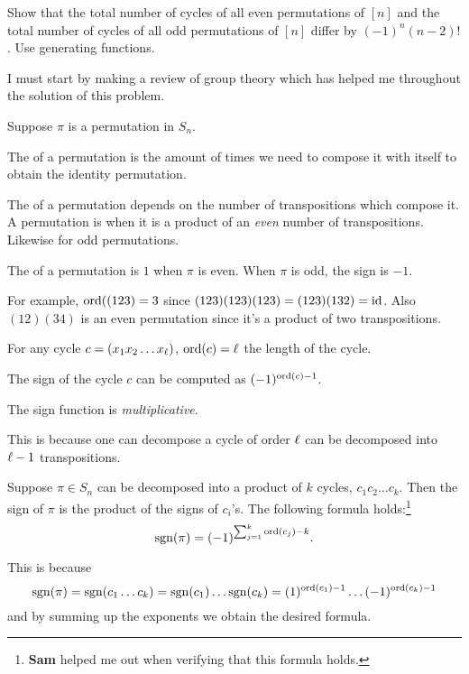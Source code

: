 \documentclass[12pt]{memoir}
\begin{document}
\begin{Ej}
    Show that the total number of cycles of all even permutations of $[n]$ and the
    total number of cycles of all odd permutations of $[n]$ differ by $(-1)^n(n-2)!$. Use generating functions.    
\end{Ej}
 
I must start by making a review of group theory which has helped me throughout the solution of this problem.

\begin{Def}
Suppose $\pi$ is a permutation in $S_n$.\par
The  of a permutation is the amount of times we need to compose it with itself to obtain the identity permutation.\par 
The  of a permutation depends on the number of transpositions which compose it. A permutation is  when it is a product of an \emph{even} number of transpositions. Likewise for odd permutations.\par 
The  of a permutation is $1$ when $\pi$ is even. When $\pi$ is odd, the sign is $-1$.
\end{Def}

For example, $\operatorname{ord}((123)=3$ since $(123)(123)(123)=(123)(132)=\operatorname{id}$. Also $(12)(34)$ is an even permutation since it's a product of two transpositions.

\begin{Prop}
For any cycle $c=(x_1x_2\dots x_\ell)$, $\operatorname{ord}(c)=\ell$ the length of the cycle.\par 
The sign of the cycle $c$ can be computed as $(-1)^{\operatorname{ord}(c)-1}$.\par 
The sign function is \emph{multiplicative}.
\end{Prop}

This is because one can decompose a cycle of order $\ell$ can be decomposed into $\ell-1$ transpositions.

\begin{Th}
Suppose $\pi\in S_n$ can be decomposed into a product of $k$ cycles, $c_1c_2\dots c_k$. Then the sign of $\pi$ is the product of the signs of $c_i$'s. The following formula holds:\footnote{\textbf{Sam} helped me out when verifying that this formula holds.}
$$\operatorname{sgn}(\pi)=(-1)^{{\sum_{j=1}^k}\operatorname{ord}(c_j)-k}.$$
\end{Th}

This is because
\vspace*{-0.5em}
$$\operatorname{sgn}(\pi)=\operatorname{sgn}(c_1\dots c_k)=\operatorname{sgn}(c_1)\dots\operatorname{sgn}(c_k)=(1)^{\operatorname{ord}(c_1)-1}\dots(-1)^{\operatorname{ord}(c_k)-1}$$
\vspace*{-0.5em}
and by summing up the exponents we obtain the desired formula.
\end{document}
